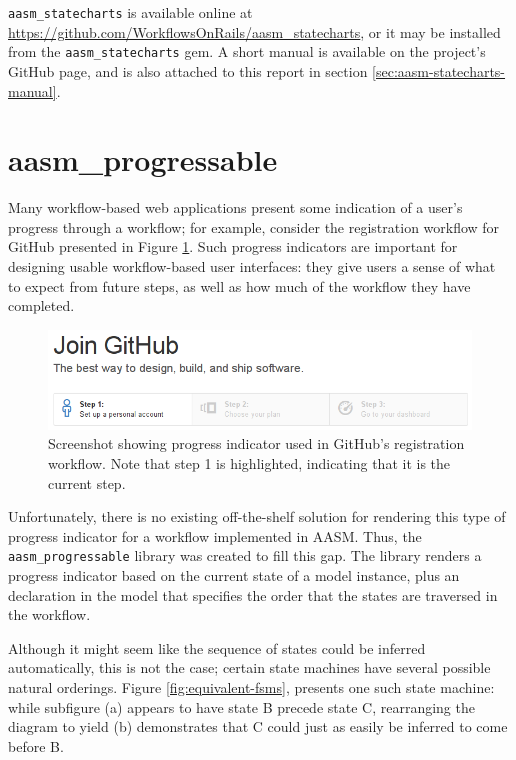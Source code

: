 \documentclass[document.tex]{subfiles}
\begin{document}
\verb!aasm_statecharts! is available online at \url{https://github.com/WorkflowsOnRails/aasm_statecharts}, or it may be installed from the \verb!aasm_statecharts! gem.
A short manual is available on the project's GitHub page, and is also attached to this report in section \ref{sec:aasm-statecharts-manual}.


\section {aasm\_progressable}

Many workflow-based web applications present some indication of a user's progress through a workflow; for example, consider the registration workflow for GitHub presented in Figure \ref{fig:github-registration}. Such progress indicators are important for designing usable workflow-based user interfaces: they give users a sense of what to expect from future steps, as well as how much of the workflow they have completed.

\begin{figure}[!htbp]
  \centering
  \includegraphics[width=6in]{./img/platform/github-registration}
  \cprotect
  \caption{Screenshot showing progress indicator used in GitHub's registration workflow. Note that step 1 is highlighted, indicating that it is the current step.}
  \label{fig:github-registration}
\end{figure}

Unfortunately, there is no existing off-the-shelf solution for rendering this type of progress indicator for a workflow implemented in AASM. Thus, the \verb!aasm_progressable! \cite{aasm_progressable} library was created to fill this gap. The library renders a progress indicator based on the current state of a model instance, plus an declaration in the model that specifies the order that the states are traversed in the workflow.

Although it might seem like the sequence of states could be inferred automatically, this is not the case; certain state machines have several possible natural orderings. Figure \ref{fig:equivalent-fsms}, presents one such state machine: while subfigure (a) appears to have state B precede state C, rearranging the diagram to yield (b) demonstrates that C could just as easily be inferred to come before B.
\end{document}
